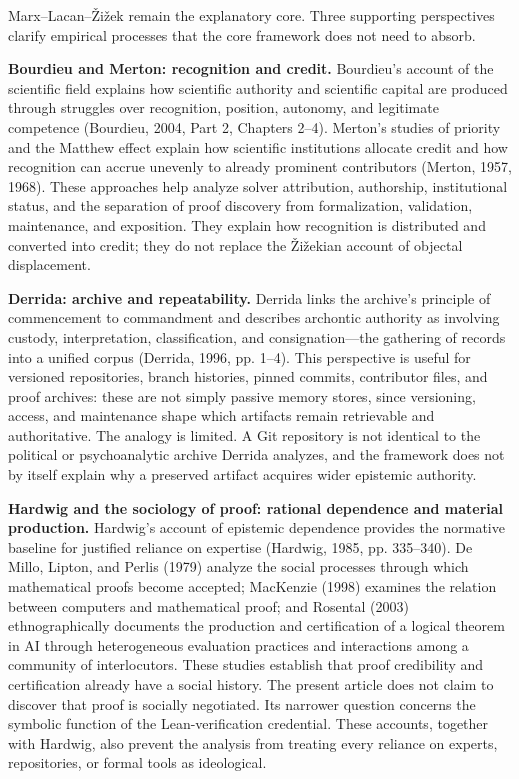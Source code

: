 \documentclass[sn-apa]{sn-jnl}
\begin{document}
Marx–Lacan–Žižek remain the explanatory core. Three supporting perspectives clarify empirical processes that the core framework does not need to absorb.

\textbf{Bourdieu and Merton: recognition and credit.} Bourdieu's account of the scientific field explains how scientific authority and scientific capital are produced through struggles over recognition, position, autonomy, and legitimate competence (Bourdieu, 2004, Part 2, Chapters 2–4). Merton's studies of priority and the Matthew effect explain how scientific institutions allocate credit and how recognition can accrue unevenly to already prominent contributors (Merton, 1957, 1968). These approaches help analyze solver attribution, authorship, institutional status, and the separation of proof discovery from formalization, validation, maintenance, and exposition. They explain how recognition is distributed and converted into credit; they do not replace the Žižekian account of objectal displacement.

\textbf{Derrida: archive and repeatability.} Derrida links the archive's principle of commencement to commandment and describes archontic authority as involving custody, interpretation, classification, and consignation—the gathering of records into a unified corpus (Derrida, 1996, pp. 1–4). This perspective is useful for versioned repositories, branch histories, pinned commits, contributor files, and proof archives: these are not simply passive memory stores, since versioning, access, and maintenance shape which artifacts remain retrievable and authoritative. The analogy is limited. A Git repository is not identical to the political or psychoanalytic archive Derrida analyzes, and the framework does not by itself explain why a preserved artifact acquires wider epistemic authority.

\textbf{Hardwig and the sociology of proof: rational dependence and material production.} Hardwig's account of epistemic dependence provides the normative baseline for justified reliance on expertise (Hardwig, 1985, pp. 335–340). De Millo, Lipton, and Perlis (1979) analyze the social processes through which mathematical proofs become accepted; MacKenzie (1998) examines the relation between computers and mathematical proof; and Rosental (2003) ethnographically documents the production and certification of a logical theorem in AI through heterogeneous evaluation practices and interactions among a community of interlocutors. These studies establish that proof credibility and certification already have a social history. The present article does not claim to discover that proof is socially negotiated. Its narrower question concerns the symbolic function of the Lean-verification credential. These accounts, together with Hardwig, also prevent the analysis from treating every reliance on experts, repositories, or formal tools as ideological.
\end{document}

